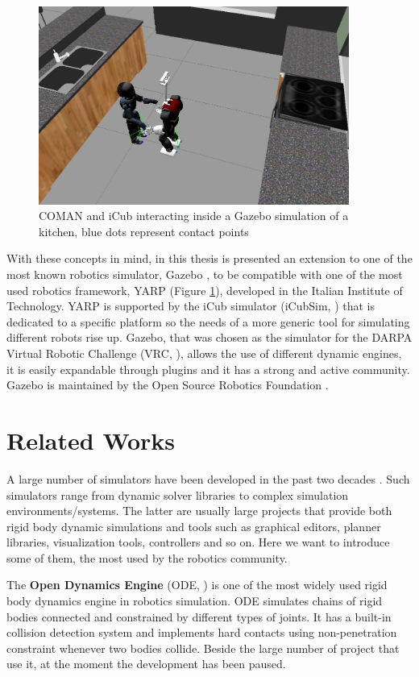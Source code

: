 \begin{figure}
\centering
\includegraphics[height=6.5cm]{gfx/coman_icub_gazebo.jpg}
\caption{COMAN and iCub interacting inside a Gazebo simulation of a kitchen, blue dots represent contact points}
\label{coman_icub_gazebo}
\end{figure}

With these concepts in mind, in this thesis is presented an extension to one of the most known robotics simulator, Gazebo \cite{koenig2004design}, to be compatible with one of the most used robotics framework, YARP (Figure \ref{coman_icub_gazebo}), developed in the Italian Institute of Technology. 
YARP is supported by the iCub simulator (iCubSim, \cite{Tikhanoff:2008}) that is dedicated to a specific platform so the needs of a more generic tool for simulating different robots rise up. 
Gazebo, that was chosen as the simulator for the DARPA Virtual Robotic Challenge (VRC, \cite{DRC:13}), allows the use of different dynamic engines, it is easily expandable through plugins and it has a strong and active community. Gazebo is maintained by the Open Source Robotics Foundation \cite{OSRF:11}.

\section{Related Works}
\label{sec:robotics-simulation:related-works}
A large number of simulators  have been developed in the past two decades \cite{Ivaldi:14}. Such simulators range from dynamic solver libraries to complex simulation environments/systems. The latter are usually large projects that provide both rigid body dynamic simulations and tools such as graphical editors, planner libraries, visualization tools, controllers and so on. Here we want to introduce some of them, the most used by the robotics community.

The \textbf{Open Dynamics Engine} (ODE, \cite{Russel:00}) is one of the most widely used rigid body dynamics engine in robotics simulation. ODE simulates chains of rigid bodies connected and constrained by different types of joints. It has a built-in collision detection system and implements hard contacts using non-penetration constraint whenever two bodies collide. Beside the large number of project that use it, at the moment the development has been paused. 

